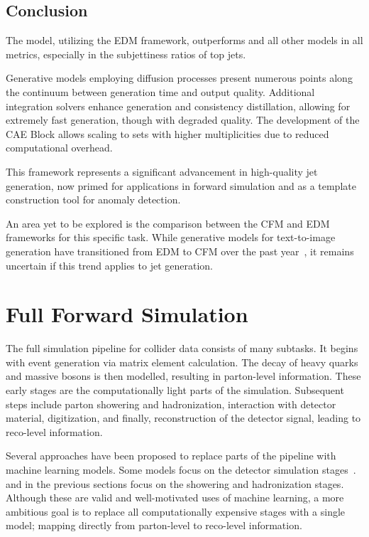 \subsection{Conclusion}

The \pcdroid model, utilizing the EDM framework, outperforms \pcjedi and all other models in all metrics, especially in the subjettiness ratios of top jets.

Generative models employing diffusion processes present numerous points along the continuum between generation time and output quality.
Additional integration solvers enhance generation and consistency distillation, allowing for extremely fast generation, though with degraded quality.
The development of the CAE Block allows scaling to sets with higher multiplicities due to reduced computational overhead.

This framework represents a significant advancement in high-quality jet generation, now primed for applications in forward simulation and as a template construction tool for anomaly detection.

An area yet to be explored is the comparison between the CFM and EDM frameworks for this specific task.
While generative models for text-to-image generation have transitioned from EDM to CFM over the past year~\cite{SD3,flux2024github}, it remains uncertain if this trend applies to jet generation.

\section{Full Forward Simulation}

The full simulation pipeline for collider data consists of many subtasks.
It begins with event generation via matrix element calculation.
The decay of heavy quarks and massive bosons is then modelled, resulting in parton-level information.
These early stages are the computationally light parts of the simulation.
Subsequent steps include parton showering and hadronization, interaction with detector material, digitization, and finally, reconstruction of the detector signal, leading to reco-level information.

Several approaches have been proposed to replace parts of the pipeline with machine learning models.
Some models focus on the detector simulation stages~\cite{CaloGAN,CaloFlow2,PhysicsGAN,ATLASGAN,CaloVQ}.
\pcjedi and \pcdroid in the previous sections focus on the showering and hadronization stages.
Although these are valid and well-motivated uses of machine learning, a more ambitious goal is to replace all computationally expensive stages with a single model; mapping directly from parton-level to reco-level information.

